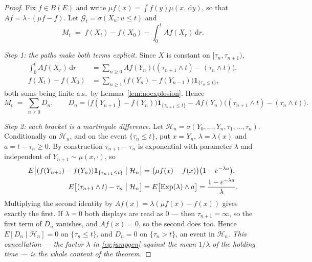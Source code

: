 \documentclass[11pt,a4paper]{article}
\theoremstyle{plain}
\theoremstyle{definition}
\theoremstyle{remark}
\newcommand{\Bdd}{B}                           %
\newcommand{\Gilt}{\mathcal{G}}
\newcommand{\one}{\mathbf{1}}
\newcommand{\dif}{\,\mathrm{d}}
\begin{document}
\begin{proof}
  Fix $f \in \Bdd(E)$ and write $\mu f(x) = \int f(y)\mu(x,\dif y)$, so that
  $Af = \lambda \cdot (\mu f - f)$.  Let $\Gilt_t = \sigma(X_u : u \leq t)$ and
  \[
    M_t \;=\; f(X_t) - f(X_0) - \int_0^t Af(X_r) \dif r .
  \]

  \emph{Step 1: the paths make both terms explicit.}  Since $X$ is constant on
  $[\tau_n, \tau_{n+1})$,
  \begin{align*}
    \int_0^t Af(X_r)\dif r
      &= \sum_{n \geq 0} Af(Y_n) \bigl( (\tau_{n+1} \wedge t) - (\tau_n \wedge t) \bigr) , \\
    f(X_t) - f(X_0)
      &= \sum_{n \geq 1} \bigl( f(Y_n) - f(Y_{n-1}) \bigr) \one_{\{\tau_n \leq t\}} ,
  \end{align*}
  both sums being finite a.s.\ by Lemma~\ref{lem:noexplosion}.  Hence
  \begin{equation}
    \label{eq:jumpbrackets}
    M_t \;=\; \sum_{n \geq 0} D_n , \qquad
    D_n = \bigl( f(Y_{n+1}) - f(Y_n) \bigr) \one_{\{\tau_{n+1} \leq t\}}
        - Af(Y_n) \bigl( (\tau_{n+1} \wedge t) - (\tau_n \wedge t) \bigr) .
  \end{equation}

  \emph{Step 2: each bracket is a martingale difference.}  Let
  $\mathcal{H}_n = \sigma(Y_0,\dots,Y_n,\tau_1,\dots,\tau_n)$.  Conditionally on
  $\mathcal{H}_n$, and on the event $\{\tau_n \leq t\}$, put $x = Y_n$,
  $\lambda = \lambda(x)$ and $a = t - \tau_n \geq 0$.  By construction
  $\tau_{n+1} - \tau_n$ is exponential with parameter $\lambda$ and independent of
  $Y_{n+1} \sim \mu(x,\cdot)$, so
  \begin{align*}
    E\bigl[ (f(Y_{n+1}) - f(Y_n)) \one_{\{\tau_{n+1} \leq t\}} \bigm| \mathcal{H}_n \bigr]
      &= \bigl( \mu f(x) - f(x) \bigr) \bigl( 1 - e^{-\lambda a} \bigr) , \\
    E\bigl[ (\tau_{n+1} \wedge t) - \tau_n \bigm| \mathcal{H}_n \bigr]
      &= E\bigl[ \mathrm{Exp}(\lambda) \wedge a \bigr]
       = \frac{1 - e^{-\lambda a}}{\lambda} .
  \end{align*}
  Multiplying the second identity by
  $Af(x) = \lambda(\mu f(x) - f(x))$ gives exactly the first.  If $\lambda = 0$
  both displays are read as $0$ --- then $\tau_{n+1} = \infty$, so the first term
  of $D_n$ vanishes, and $Af(x) = 0$, so the second does too.  Hence
  $E[D_n \mid \mathcal{H}_n] = 0$ on $\{\tau_n \leq t\}$, and $D_n = 0$ on
  $\{\tau_n > t\}$, an event in $\mathcal{H}_n$.  \emph{This cancellation --- the
  factor $\lambda$ in \eqref{eq:jumpgen} against the mean $1/\lambda$ of the
  holding time --- is the whole content of the theorem.}


\end{proof}
\end{document}
